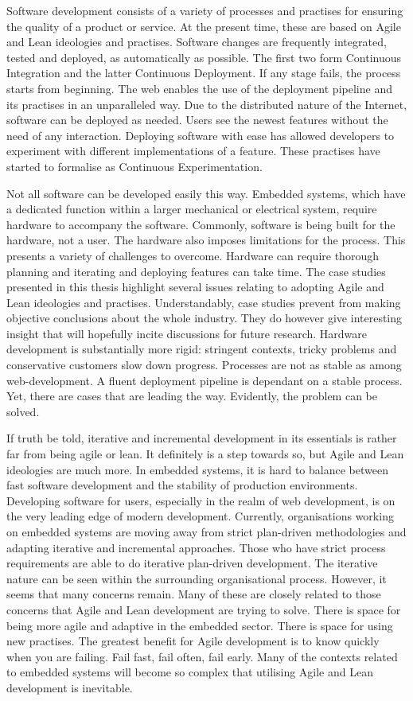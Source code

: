\documentclass[english]{tktltiki2}
\begin{document}
Software development consists of a variety of processes and practises for ensuring the quality of a product or service. At the present time, these are based on Agile and Lean ideologies and practises. Software changes are frequently integrated, tested and deployed, as automatically as possible. The first two form Continuous Integration and the latter Continuous Deployment. If any stage fails, the process starts from beginning. The web enables the use of the deployment pipeline and its practises in an unparalleled way. Due to the distributed nature of the Internet, software can be deployed as needed. Users see the newest features without the need of any interaction. Deploying software with ease has allowed developers to experiment with different implementations of a feature. These practises have started to formalise as Continuous Experimentation.

Not all software can be developed easily this way. Embedded systems, which have a dedicated function within a larger mechanical or electrical system, require hardware to accompany the software. Commonly, software is being built for the hardware, not a user. The hardware also imposes limitations for the process. This presents a variety of challenges to overcome. Hardware can require thorough planning and iterating and deploying features can take time. The case studies presented in this thesis highlight several issues relating to adopting Agile and Lean ideologies and practises. Understandably, case studies prevent from making objective conclusions about the whole industry. They do however give interesting insight that will hopefully incite discussions for future research. Hardware development is substantially more rigid: stringent contexts, tricky problems and conservative customers slow down progress. Processes are not as stable as among web-development. A fluent deployment pipeline is dependant on a stable process. Yet, there are cases that are leading the way. Evidently, the problem can be solved.

If truth be told, iterative and incremental development in its essentials is rather far from being agile or lean. It definitely is a step towards so, but Agile and Lean ideologies are much more. In embedded systems, it is hard to balance between fast software development and the stability of production environments. Developing software for users, especially in the realm of web development, is on the very leading edge of modern development. Currently, organisations working on embedded systems are moving away from strict plan-driven methodologies and adapting iterative and incremental approaches. Those who have strict process requirements are able to do iterative plan-driven development. The iterative nature can be seen within the surrounding organisational process. However, it seems that many concerns remain. Many of these are closely related to those concerns that Agile and Lean development are trying to solve. There is space for being more agile and adaptive in the embedded sector. There is space for using new practises. The greatest benefit for Agile development is to know quickly when you are failing. Fail fast, fail often, fail early. Many of the contexts related to embedded systems will become so complex that utilising Agile and Lean development is inevitable.
\end{document}
